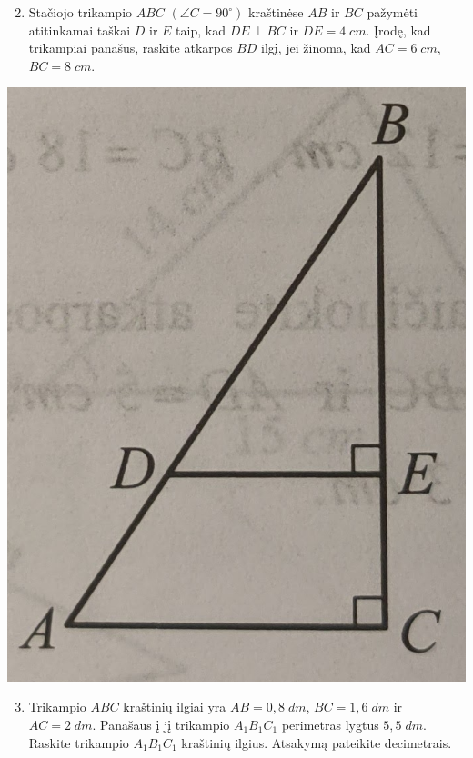 \documentclass[a4paper]{article}
\begin{document}
\begin{minipage}{0.5\textwidth}
      \begin{enumerate}
            \setcounter{enumi}{1} %
            \item Stačiojo trikampio $ABC$ $(\angle C= 90^\circ)$ kraštinėse $AB$ ir $BC$
                  pažymėti atitinkamai taškai $D$ ir $E$ taip, kad $DE \perp BC$ ir $DE = 4 \;
                        cm$. Įrodę, kad trikampiai panašūs, raskite atkarpos $BD$ ilgį, jei žinoma, kad
                  $AC = 6 \; cm$, $BC = 8 \; cm$.
      \end{enumerate}
      \begin{center}
            \includegraphics[scale=0.5]{images/triangle_2.png}
      \end{center}
\end{minipage}

\begin{enumerate}
      \setcounter{enumi}{2} %
      \item Trikampio $ABC$ kraštinių ilgiai yra $AB=0,8 \; dm$, $BC=1,6 \; dm$ ir $AC=2 \;
                  dm$. Panašaus į jį trikampio $A_1B_1C_1$ perimetras lygtus $5,5 \; dm$. Raskite
            trikampio $A_1B_1C_1$ kraštinių ilgius. Atsakymą pateikite decimetrais.
\end{enumerate}
\end{document}
